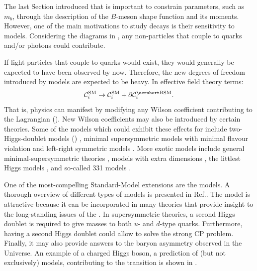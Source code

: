 The last Section introduced that \BtoXsgamma is important to constrain \SM parameters, 
such as $m_b$, through the description of the $B$-meson shape function and its moments.
However, one of the main motivations to study \BtoXsgamma decays is their sensitivity to \BSM models.
Considering the \SM diagrams in , any non-\SM particles that couple to quarks and/or photons could contribute.

If light particles that couple to quarks would exist, they would generally be expected to have been observed by now.
Therefore, the new degrees of freedom introduced by \BSM models are expected to be heavy.
In effective field theory terms:
\begin{equation}\label{eq:corr_wilson}
    \mathcal{C}_i^{\mathrm{SM}} \ra \mathcal{C}_i^{\mathrm{SM}} + \partial\mathcal{C}_i^{\mathrm{\BSM}}.
\end{equation}
That is, \BSM physics can manifest by modifying any Wilson coefficient contributing to the \btosgamma Lagrangian ().
New Wilson coefficients may also be introduced by certain theories.
Some of the models which could exhibit these effects for \BtoXsgamma include 
two-Higgs-doublet models (\TwoHDM) \cite{Borzumati:1998tg,Bobeth:1999ww,Hermann:2012fc}, 
minimal supersymmetric models with minimal flavour violation \cite{Bobeth:1999ww,Borzumati:2003rr,Degrassi:2006eh,Freitas:2007dp}
and left-right symmetric models \cite{Bobeth:1999ww}.
More exotic models include 
general minimal-supersymmetric theories \cite{Ciuchini:2007ha},
models with extra dimensions \cite{Buras:2003mk,Agashe:2004cp,Haisch:2007vb,Freitas:2008vh},
the littlest Higgs models \cite{Buras:2006wk,Blanke:2006sb},
and so-called 331 models \cite{Promberger:2008xg}.

One of the most-compelling Standard-Model extensions are the \TwoHDM models.
A thorough overview of different types of \TwoHDM models is presented in Ref.\cite{Branco:2011iw}.
The model is attractive because it can be incorporated in many theories that provide insight to the long-standing issues of the \SM.
In supersymmetric theories, a second Higgs doublet is required to give masses to both $u$- and $d$-type quarks.
Furthermore, having a second Higgs doublet could allow to solve the strong CP problem.
Finally, it may also provide answers to the baryon asymmetry observed in the Universe.
An example of a charged Higgs boson, a prediction of (but not exclusively) \TwoHDM models, contributing to the \btosgamma transition is shown in .

